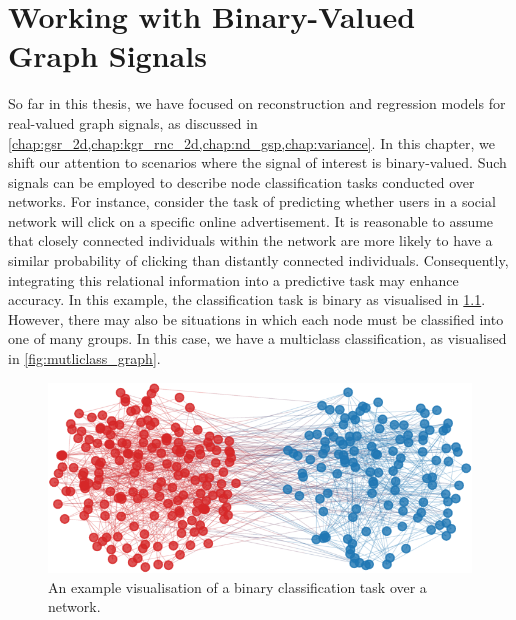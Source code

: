 \chapter{Working with Binary-Valued Graph Signals} %

\label{chap:binary} 


So far in this thesis, we have focused on reconstruction and regression models for real-valued graph signals, as discussed in \cref{chap:gsr_2d,chap:kgr_rnc_2d,chap:nd_gsp,chap:variance}. In this chapter, we shift our attention to scenarios where the signal of interest is binary-valued. Such signals can be employed to describe node classification tasks conducted over networks. For instance, consider the task of predicting whether users in a social network will click on a specific online advertisement. It is reasonable to assume that closely connected individuals within the network are more likely to have a similar probability of clicking than distantly connected individuals. Consequently, integrating this relational information into a predictive task may enhance accuracy. In this example, the classification task is binary as visualised in \cref{fig:binary_class_graph}. However, there may also be situations in which each node must be classified into one of many groups. In this case, we have a multiclass classification, as visualised in \cref{fig:mutliclass_graph}. \cite{Li2012}


\begin{figure}[t] 
    \begin{center}
        \includegraphics[width=0.8\linewidth]{Figures/2class_graph.pdf}
    \end{center}
   \caption[Visualisation of a binary classification task over a network]{An example visualisation of a binary classification task over a network.} 
    \label{fig:binary_class_graph}
\end{figure} 

